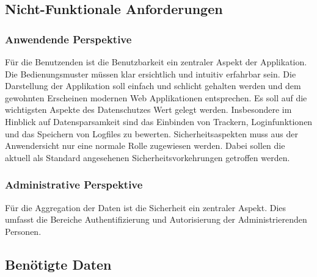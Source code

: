 

\subsection{Nicht-Funktionale Anforderungen}

    \subsubsection{Anwendende Perspektive}
        Für die Benutzenden ist die Benutzbarkeit ein zentraler Aspekt der Applikation. Die Bedienungsmuster müssen klar ersichtlich und intuitiv erfahrbar sein. Die Darstellung der Applikation soll einfach und schlicht gehalten werden und dem gewohnten Erscheinen modernen Web Applikationen entsprechen.
        Es soll auf die wichtigsten Aspekte des Datenschutzes Wert gelegt werden. Insbesondere im Hinblick auf Datensparsamkeit sind das Einbinden von Trackern, Loginfunktionen und das Speichern von Logfiles zu bewerten.
        Sicherheitsaspekten muss aus der Anwendersicht nur eine normale Rolle zugewiesen werden. Dabei sollen die aktuell als Standard angesehenen Sicherheitsvorkehrungen getroffen werden.

    \subsubsection{Administrative Perspektive}
        Für die Aggregation der Daten ist die Sicherheit ein zentraler Aspekt. Dies umfasst  die Bereiche Authentifizierung und Autorisierung der Administrierenden Personen.



\subsection{Benötigte Daten}

